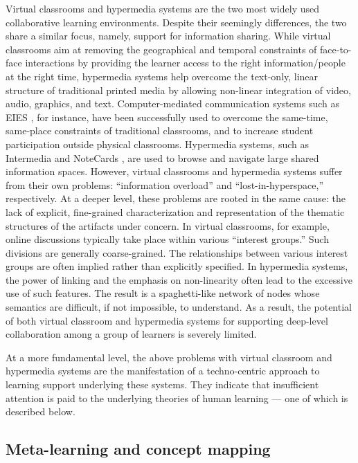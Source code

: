 Virtual classrooms and hypermedia systems are the two most widely used
collaborative learning environments. Despite their seemingly differences,
the two share a similar focus, namely, support for information
sharing. While virtual classrooms aim at removing the geographical and
temporal constraints of face-to-face interactions by providing the learner
access to the right information/people at the right time, hypermedia
systems help overcome the text-only, linear structure of traditional
printed media by allowing non-linear integration of video, audio, graphics,
and text. Computer-mediated communication systems such as EIES
\cite{Hiltz88}, for instance, have been successfully used to overcome the
same-time, same-place constraints of traditional classrooms, and to
increase student participation outside physical classrooms. Hypermedia
systems, such as Intermedia \cite{Yankelovich88} and NoteCards
\cite{Halasz87Notecards}, are used to browse and navigate large shared
information spaces. However, virtual classrooms and hypermedia systems
suffer from their own problems: ``information overload'' and
``lost-in-hyperspace,'' respectively. At a deeper level, these problems are
rooted in the same cause: the lack of explicit, fine-grained
characterization and representation of the thematic structures of the
artifacts under concern. In virtual classrooms, for example, online
discussions typically take place within various ``interest groups.'' Such
divisions are generally coarse-grained. The relationships between various
interest groups are often implied rather than explicitly specified. In
hypermedia systems, the power of linking and the emphasis on non-linearity
often lead to the excessive use of such features. The result is a 
spaghetti-like network
of nodes whose semantics are difficult, if
not impossible, to understand. As a result, the potential of both virtual
classroom and hypermedia systems for supporting deep-level collaboration
among a group of learners is severely limited.

At a more fundamental level, the above problems with virtual classroom and
hypermedia systems are the manifestation of a techno-centric approach to
learning support underlying these systems. They indicate that insufficient
attention is paid to the underlying theories of human learning --- one of
which is described below.


\subsection{Meta-learning and concept mapping}

